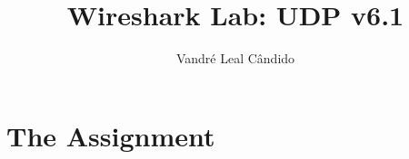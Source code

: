\documentclass[11pt]{article}
\begin{document}
%
\author{Vandré Leal Cândido}
\title{Wireshark Lab: UDP v6.1}
\maketitle


\section{The Assignment}
\end{document}
